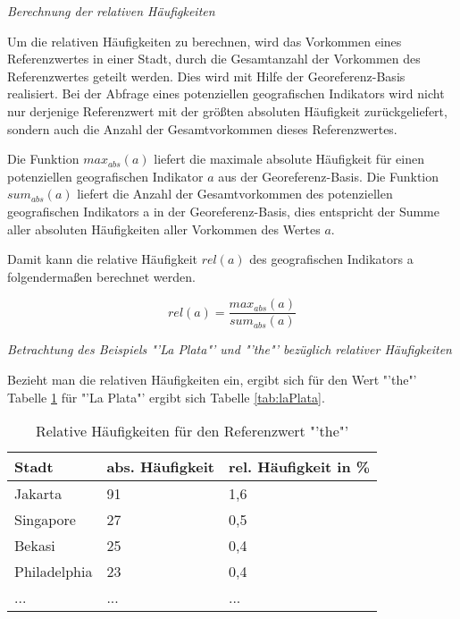 			\textit{Berechnung der relativen Häufigkeiten}  

				Um die relativen Häufigkeiten zu berechnen, wird das Vorkommen eines Referenzwertes in einer Stadt, durch die Gesamtanzahl der Vorkommen des Referenzwertes geteilt werden.
				Dies wird mit Hilfe der Georeferenz-Basis realisiert.
				Bei der Abfrage eines potenziellen geografischen Indikators wird nicht nur derjenige Referenzwert mit der größten absoluten Häufigkeit zurückgeliefert, sondern auch die Anzahl der Gesamtvorkommen dieses Referenzwertes.

				Die Funktion $max_{abs}(a)$ liefert die maximale absolute Häufigkeit für einen potenziellen geografischen Indikator $a$ aus der Georeferenz-Basis.
				Die Funktion $sum_{abs}(a)$ liefert die Anzahl der Gesamtvorkommen des potenziellen geografischen Indikators a in der Georeferenz-Basis, dies entspricht der Summe aller absoluten Häufigkeiten aller Vorkommen des Wertes $a$.

				Damit kann die relative Häufigkeit  $rel(a)$ des geografischen Indikators a folgendermaßen berechnet werden.

				\begin{equation}
					rel(a)=\frac{max_{abs}(a)}{sum_{abs}(a)}
				\end{equation}	

			\textit{Betrachtung des Beispiels "'La Plata"' und "'the"' bezüglich relativer Häufigkeiten} 
				
				Bezieht man die relativen Häufigkeiten ein, ergibt sich für den Wert "'the"' Tabelle \ref{tab:the} für "'La Plata"' ergibt sich Tabelle \ref{tab:laPlata}.  

				\begin{table}[h]
				\centering
				\caption{Relative Häufigkeiten für den Referenzwert "'the"'}
				\label{tab:the}
				\begin{tabular}{|l|l|l|}
				\hline
				Stadt             & abs. Häufigkeit & rel. Häufigkeit in \% \\ \hline \hline
				Jakarta           & 91              & 1,6                       \\ \hline
				Singapore         & 27              & 0,5                       \\ \hline
				Bekasi            & 25              & 0,4                       \\ \hline
				Philadelphia      & 23              & 0,4                       \\ \hline
				... & ... & ... \\ \hline
				\end{tabular}
				\end{table}

